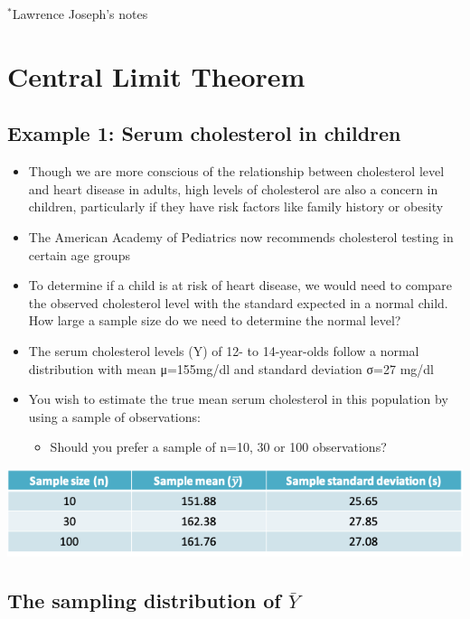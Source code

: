 \documentclass[
]{book}
\providecommand{\tightlist}{%
  \setlength{\itemsep}{0pt}\setlength{\parskip}{0pt}}
\begin{document}
\(^*\)Lawrence Joseph's notes

\hypertarget{central-limit-theorem}{%
\section{Central Limit Theorem}\label{central-limit-theorem}}

\hypertarget{example-1-serum-cholesterol-in-children}{%
\subsection{Example 1: Serum cholesterol in children}\label{example-1-serum-cholesterol-in-children}}

\begin{itemize}
\tightlist
\item
  Though we are more conscious of the relationship between cholesterol level and heart disease in adults, high levels of cholesterol are also a concern in children, particularly if they have risk factors like family history or obesity
\item
  The American Academy of Pediatrics now recommends cholesterol testing in certain age groups
\item
  To determine if a child is at risk of heart disease, we would need to compare the observed cholesterol level with the standard expected in a normal child. How large a sample size do we need to determine the normal level?
\item
  The serum cholesterol levels (Y) of 12- to 14-year-olds follow a normal distribution with mean μ=155mg/dl and standard deviation σ=27 mg/dl
\item
  You wish to estimate the true mean serum cholesterol in this population by using a sample of observations:

  \begin{itemize}
  \tightlist
  \item
    Should you prefer a sample of n=10, 30 or 100 observations?
  \end{itemize}
\end{itemize}

\includegraphics[width=1\linewidth]{./3_21}

\hypertarget{the-sampling-distribution-of-bar-y}{%
\subsection{\texorpdfstring{The sampling distribution of \(\bar Y\)}{The sampling distribution of \textbackslash bar Y}}\label{the-sampling-distribution-of-bar-y}}
\end{document}

